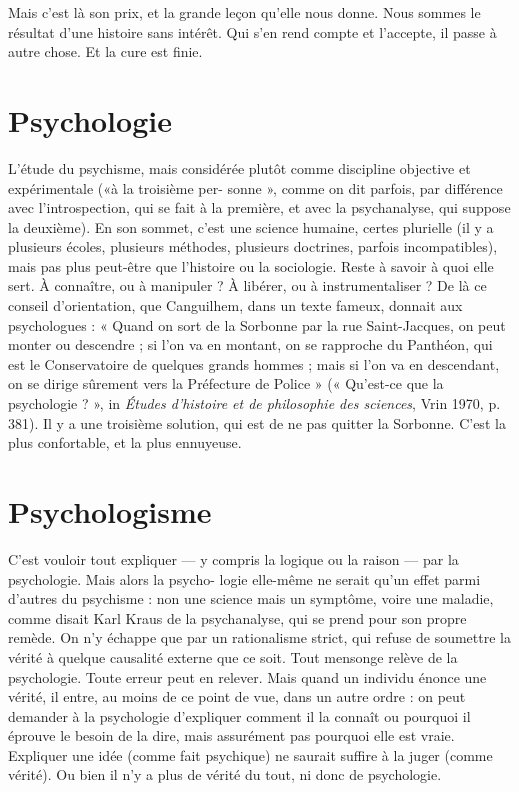 Mais c’est là son prix, et la grande leçon qu’elle nous donne. Nous sommes
le résultat d’une histoire sans intérêt. Qui s’en rend compte et l’accepte, il passe
à autre chose. Et la cure est finie.

\section{Psychologie}
L'étude du psychisme, mais considérée plutôt comme discipline
objective et expérimentale («à la troisième per-
sonne », comme on dit parfois, par différence avec l’introspection, qui se fait à
la première, et avec la psychanalyse, qui suppose la deuxième). En son sommet,
c’est une science humaine, certes plurielle (il y a plusieurs écoles, plusieurs
méthodes, plusieurs doctrines, parfois incompatibles), mais pas plus peut-être
que l’histoire ou la sociologie. Reste à savoir à quoi elle sert. À connaître, ou à
manipuler ? À libérer, ou à instrumentaliser ? De là ce conseil d’orientation,
que Canguilhem, dans un texte fameux, donnait aux psychologues : « Quand
on sort de la Sorbonne par la rue Saint-Jacques, on peut monter ou descendre ;
si l’on va en montant, on se rapproche du Panthéon, qui est le Conservatoire
de quelques grands hommes ; mais si l’on va en descendant, on se dirige sûrement
vers la Préfecture de Police » (« Qu'est-ce que la psychologie ? », in {\it Études
d'histoire et de philosophie des sciences}, Vrin 1970, p. 381). Il y a une troisième
solution, qui est de ne pas quitter la Sorbonne. C’est la plus confortable, et la
plus ennuyeuse.

\section{Psychologisme}
C'est vouloir tout expliquer — y compris la logique ou
la raison — par la psychologie. Mais alors la psycho-
logie elle-même ne serait qu’un effet parmi d’autres du psychisme : non une
science mais un symptôme, voire une maladie, comme disait Karl Kraus de la
psychanalyse, qui se prend pour son propre remède. On n’y échappe que par
un rationalisme strict, qui refuse de soumettre la vérité à quelque causalité
externe que ce soit. Tout mensonge relève de la psychologie. Toute erreur peut
en relever. Mais quand un individu énonce une vérité, il entre, au moins de ce
point de vue, dans un autre ordre : on peut demander à la psychologie d’expliquer
comment il la connaît ou pourquoi il éprouve le besoin de la dire, mais
assurément pas pourquoi elle est vraie. Expliquer une idée (comme fait psychique)
ne saurait suffire à la juger (comme vérité). Ou bien il n’y a plus de
vérité du tout, ni donc de psychologie.


